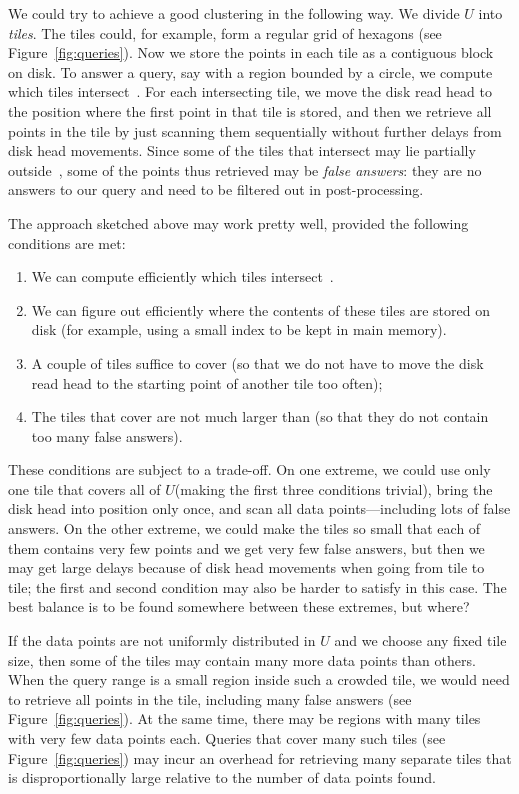 \documentclass[11pt,a4paper]{article}
\newcommand{\unittile}{\ensuremath{U}\xspace}
\begin{document}
We could try to achieve a good clustering in the following way. We divide \unittile into \emph{tiles}. The tiles could, for example, form a regular grid of hexagons (see Figure~\ref{fig:queries}). Now we store the points in each tile as a contiguous block on disk. To answer a query, say with a region  bounded by a circle, we compute which tiles intersect~. For each intersecting tile, we move the disk read head to the position where the first point in that tile is stored, and then we retrieve all points in the tile by just scanning them sequentially without further delays from disk head movements. Since some of the tiles that intersect  may lie partially outside~, some of the points thus retrieved may be \emph{false answers}: they are no answers to our query and need to be filtered out in post-processing.

The approach sketched above may work pretty well, provided the following conditions are met:\begin{enumerate}
\item We can compute efficiently which tiles intersect~.
\item We can figure out efficiently where the contents of these tiles are stored on disk (for example, using a small index to be kept in main memory).
\item A couple of tiles suffice to cover  (so that we do not have to move the disk read head to the starting point of another tile too often);
\item The tiles that cover  are not much larger than  (so that they do not contain too many false answers).
\end{enumerate}
These conditions are subject to a trade-off. On one extreme, we could use only one tile that covers all of \unittile (making the first three conditions trivial), bring the disk head into position only once, and scan all data points---including lots of false answers. On the other extreme, we could make the tiles so small that each of them contains very few points and we get very few false answers, but then we may get large delays because of disk head movements when going from tile to tile; the first and second condition may also be harder to satisfy in this case. The best balance is to be found somewhere between these extremes, but where?

If the data points are not uniformly distributed in \unittile and we choose any fixed tile size, then some of the tiles may contain many more data points than others. When the query range  is a small region inside such a crowded tile, we would need to retrieve all points in the tile, including many false answers (see Figure~\ref{fig:queries}). At the same time, there may be regions with many tiles with very few data points each. Queries that cover many such tiles (see Figure~\ref{fig:queries}) may incur an overhead for retrieving many separate tiles that is disproportionally large relative to the number of data points found.
\end{document}
